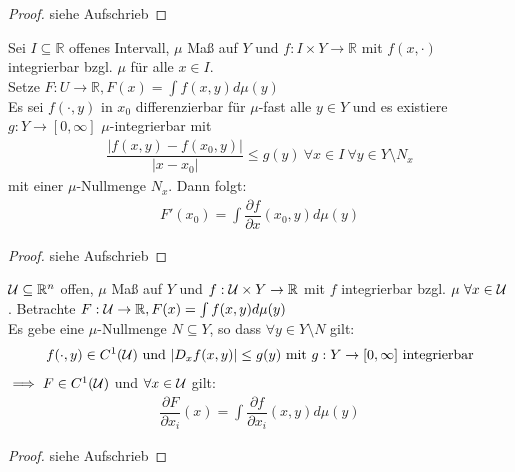   \begin{proof}
    siehe Aufschrieb
  \end{proof}


  \begin{theorem}
    Sei $I \subseteq \mathbb{R}$ offenes Intervall, $\mu$ Maß auf $Y$ und $f: I \times Y \to \mathbb{R}$ mit $f(x, \cdot)$ integrierbar bzgl. $\mu$ für alle $x \in I$.\\
    Setze $F: U \to \mathbb{R}, F(x) = \int f(x,y) d\mu(y)$\\
    Es sei $f(\cdot, y)$ in $x_0$ differenzierbar für $\mu$-fast alle $y \in Y$ und es existiere $g: Y \to [0, \infty]$ $\mu$-integrierbar mit
    \begin{align*}
      \dfrac{|f(x,y) - f(x_0, y)|}{|x-x_0|} \leq g(y) \ \forall x\in I \ \forall y \in Y \setminus N_x
    \end{align*} 
    mit einer $\mu$-Nullmenge $N_x$. Dann folgt:
    \begin{align*}
      F'(x_0) = \int \dfrac{\partial f}{\partial x} (x_0, y) d\mu(y)
    \end{align*}
  \end{theorem}
  \begin{proof}
    siehe Aufschrieb
  \end{proof}

  \newpage

  \begin{lemma}
    $\mathcal{U} \subseteq \mathbb{R}^n$ offen, $\mu$ Maß auf $Y$ und $f: \mathcal{U} \times Y \to \mathbb{R}$ mit $f$ integrierbar bzgl. $\mu \ \forall x \in \mathcal{U}$. Betrachte $F: \mathcal{U} \to \mathbb{R}, F(x) = \int f(x,y) d\mu(y)$\\
    Es gebe eine $\mu$-Nullmenge $N \subseteq Y$, so dass $\forall y \in Y \setminus N$ gilt:
    \begin{align*}
      f(\cdot, y) \in C^1(\mathcal{U}) \text{ und } |D_x f(x,y)| \leq g(y) \text{ mit } g: Y \to [0, \infty] \text{ integrierbar}
    \end{align*}
    $\implies F \in C^1(\mathcal{U})$ und $\forall x \in \mathcal{U}$ gilt:
    \begin{align*}
      \dfrac{\partial F}{\partial x_i}(x) = \int \dfrac{\partial f}{\partial x_i}(x,y) d\mu(y)
    \end{align*}
  \end{lemma}

  \begin{proof}
    siehe Aufschrieb
  \end{proof}

